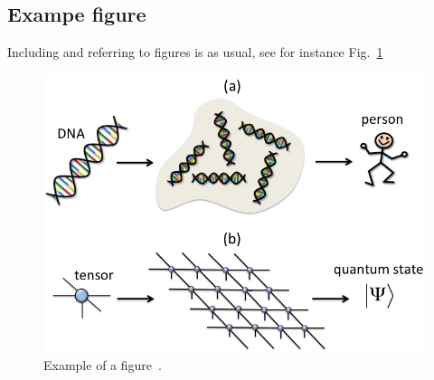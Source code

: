 \subsection{Exampe figure}
Including and referring to figures is as usual, see for instance Fig.~\ref{fig:example}
\begin{figure}
\includegraphics[width=0.99\linewidth]{cartoon.png}
\caption{Example of a figure~\cite{Orus2013}.}
\label{fig:example}
\end{figure}



\appendix


